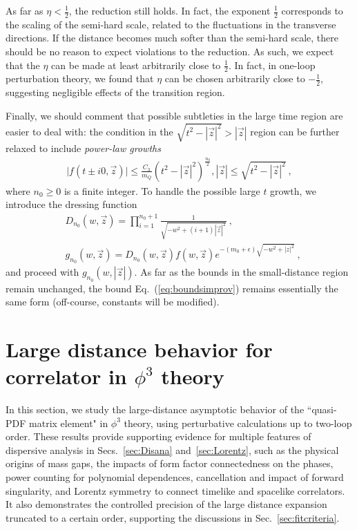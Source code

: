 \documentclass[a4paper,11pt]{article}
\begin{document}
As far as $\eta<\frac{1}{2}$, the reduction still holds. In fact, the exponent $\frac{1}{2}$ corresponds to the scaling of the semi-hard scale, related to the fluctuations in the transverse directions. If the distance becomes much softer than the semi-hard scale, there should be no reason to expect violations to the reduction. As such, we expect that the $\eta$ can be made at least arbitrarily close to $\frac{1}{2}$. 
In fact, in one-loop perturbation theory, we found that $\eta$ can be chosen arbitrarily close to $-\frac{1}{2}$, suggesting negligible effects of the transition region.  

Finally, we should comment that possible subtleties in the large time region are easier to deal with: the condition in the $\sqrt{t^2-|\vec{z}|^2}>|\vec{z}|$ region can be further relaxed to include {\it power-law growths} 
\begin{align}
\bigg|f(t\pm i0,\vec{z})\bigg|\le \frac{C_3}{m_Q} (t^2-|\vec{z}|^2)^{\frac{n_0}{2}}, |\vec{z}|\le \sqrt{t^2-|\vec{z}|^2} \ , 
\end{align}
where $n_0\ge 0$ is a finite integer. To handle the possible large $t$ growth, we introduce the dressing function
\begin{align}
&D_{n_0}(w,\vec{z})=\prod_{i=1}^{n_0+1}\frac{1}{\sqrt{-w^2+(i+1)|\vec{z}|^2 }} \ , \\
&g_{n_0}(w,\vec{z})=D_{n_0}(w,\vec{z})f(w,\vec{z})e^{-(m_0+\epsilon)\sqrt{-w^2+|z|^2}} \ ,
\end{align}
and proceed with $g_{n_0}(w,|\vec{z}|)$. As far as the bounds in the small-distance region remain unchanged, the bound Eq.~(\ref{eq:boundsimprov}) remains essentially the same form (off-course, constants will be modified).
 


\section{Large distance behavior for correlator in $\phi^3$ theory}\label{sec:phi3}
In this section, we study the large-distance asymptotic behavior of the ``quasi-PDF matrix element" in $\phi^3$ theory, using perturbative calculations up to two-loop order. These results provide supporting evidence for multiple features of dispersive analysis in Secs.~\ref{sec:Disana} and~\ref{sec:Lorentz}, such as the physical origins of mass gaps, the impacts of form factor connectedness on the phases, power counting for polynomial dependences, cancellation and impact of forward singularity, and Lorentz symmetry to connect timelike and spacelike correlators. It also demonstrates the controlled precision of the large distance expansion truncated to a certain order, supporting the discussions in Sec.~\ref{sec:fitcriteria}. 
\end{document}
